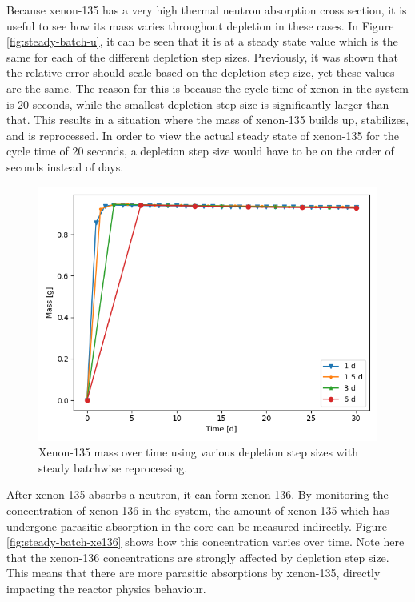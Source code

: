 {Because xenon-135 has a very high thermal neutron absorption cross section, it is useful to see how its mass varies throughout depletion in these cases.
In Figure \ref{fig:steady-batch-u}, it can be seen that it is at a steady state value which is the same for each of the different depletion step sizes.
Previously, it was shown that the relative error should scale based on the depletion step size, yet these values are the same. The reason for this is because the cycle time of xenon in the system is 20 seconds, while the smallest depletion step size is significantly larger than that. This results in a situation where the mass of xenon-135 builds up, stabilizes, and is reprocessed. In order to view the actual steady state of xenon-135 for the cycle time of 20 seconds, a depletion step size would have to be on the order of seconds instead of days.

\begin{figure}[H]
  \centering
  \includegraphics[scale=0.7]{images/Xe135_sp_comp.png}
  \caption{Xenon-135 mass over time using various depletion step sizes with steady batchwise reprocessing.}
   \label{fig:steady-batch-xe135}
\end{figure}

After xenon-135 absorbs a neutron, it can form xenon-136.
By monitoring the concentration of xenon-136 in the system, the amount of xenon-135 which has undergone parasitic absorption in the core can be measured indirectly.
Figure \ref{fig:steady-batch-xe136} shows how this concentration varies over time.
Note here that the xenon-136 concentrations are strongly affected by depletion step size.
This means that there are more parasitic absorptions by xenon-135, directly impacting the reactor physics behaviour.

}

